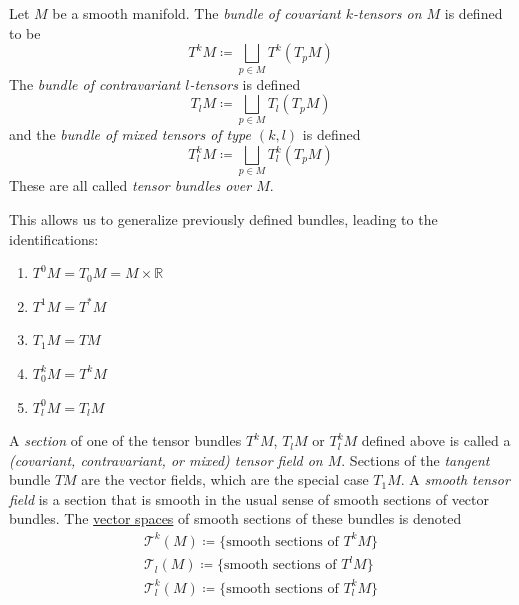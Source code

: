 \documentclass{article}
\newcounter{definition}[section]
\begin{document}
    \begin{definition}
      \label{def:bundle-of-covariant-k-tensors-on-m}
    Let $M$ be a smooth manifold. The \textit{bundle of covariant $k$-tensors on $M$} is defined to be 
    \begin{equation}
      T^k M \coloneqq \bigsqcup_{p \in M} T^k (T_p M)
    \end{equation}
    The \textit{bundle of contravariant $l$-tensors} is defined
    \begin{equation}
      T_l M \coloneqq \bigsqcup_{p \in M} T_l (T_p M)
    \end{equation}
    and the \textit{bundle of mixed tensors of type $(k, l)$} is defined
    \begin{equation}
      T^k_l M \coloneqq \bigsqcup_{p \in M} T_l^k (T_p M)
    \end{equation}
    These are all called \textit{tensor bundles over $M$}. 
    \end{definition}

    This allows us to generalize previously defined bundles, leading to the identifications: 
    \begin{enumerate}
        \item $T^0 M = T_0 M = M \times \mathbb{R}$
        \item $T^1 M = T^* M$
        \item $T_1 M = T M$
        \item $T^k_0 M = T^k M$
        \item $T^0_l M = T_l M$
    \end{enumerate}

    \begin{definition}
      \label{def:tensor-field}
    A \textit{section} of one of the tensor bundles $T^k M$, $T_l M$ or $T^k_l M$ defined above is called a \textit{(covariant, contravariant, or mixed) tensor field on $M$}. Sections of the \textit{tangent} bundle $TM$ are the vector fields, which are the special case $T_1 M$. A \textit{smooth tensor field} is a section that is smooth in the usual sense of smooth sections of vector bundles. The \hyperref[lin-def:vector-space]{vector spaces} of smooth sections of these bundles is denoted
    \begin{align*}
        \mathcal{T}^k (M) \coloneqq \{\text{smooth sections of } T^k M \} \\
        \mathcal{T}_l (M) \coloneqq \{\text{smooth sections of } T^l M \} \\
        \mathcal{T}^k_l (M) \coloneqq \{\text{smooth sections of } T^k_l M \}
    \end{align*}
    \end{definition}
\end{document}

